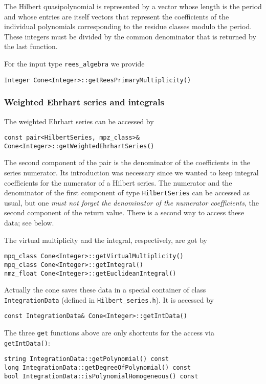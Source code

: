 \begin{small}
The Hilbert quasipolynomial is represented by a vector whose length is the period and whose entries are itself vectors that represent the coefficients of the individual polynomials corresponding to the residue classes modulo the period. These integers must be divided by the common denominator that is returned by the last function.

For the input type \verb|rees_algebra| we provide
\begin{Verbatim}
Integer Cone<Integer>::getReesPrimaryMultiplicity()
\end{Verbatim}

\subsubsection{Weighted Ehrhart series and integrals}

The weighted Ehrhart series can be accessed by
\begin{Verbatim}
const pair<HilbertSeries, mpz_class>& Cone<Integer>::getWeightedEhrhartSeries()
\end{Verbatim}
The second component of the pair is the denominator of the coefficients in the series numerator. Its introduction was necessary since we wanted to keep integral coefficients for the numerator of a Hilbert series. The numerator and the denominator of the first component of type \verb|HilbertSeries| can be accessed as usual, but one \emph{must not forget the denominator of the numerator coefficients}, the second component of the return value. There is a second way to access these data; see below.

The virtual multiplicity and the integral, respectively, are got by
\begin{Verbatim}
mpq_class Cone<Integer>::getVirtualMultiplicity()
mpq_class Cone<Integer>::getIntegral()
nmz_float Cone<Integer>::getEuclideanIntegral()
\end{Verbatim}

Actually the cone saves these data in a special container of class \verb|IntegrationData| (defined in \verb|Hilbert_series.h|). It is accessed by
\begin{Verbatim}
const IntegrationData& Cone<Integer>::getIntData()
\end{Verbatim}
The three \verb|get| functions above are only shortcuts for the access via \verb|getIntData()|:
\begin{Verbatim}
string IntegrationData::getPolynomial() const
long IntegrationData::getDegreeOfPolynomial() const
bool IntegrationData::isPolynomialHomogeneous() const


\end{Verbatim}
\end{small}

